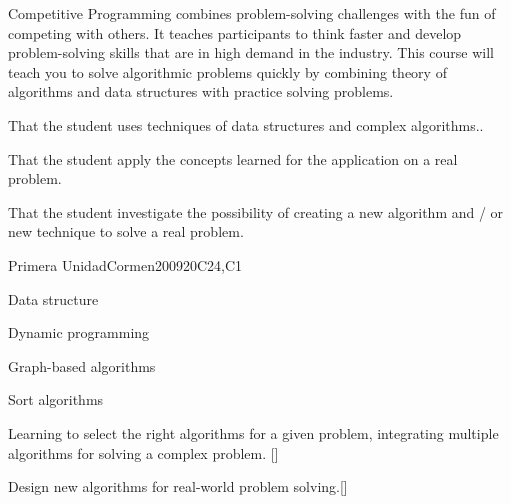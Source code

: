 \begin{syllabus}


\begin{justification}
Competitive Programming combines problem-solving challenges with the fun of competing with others. It teaches participants to think faster and develop problem-solving skills that are in high demand in the industry.
This course will teach you to solve algorithmic problems quickly by combining theory of algorithms and data structures with practice solving problems.
\end{justification}

\begin{goals}
\item That the student uses techniques of data structures and complex algorithms..
\item That the student apply the concepts learned for the application on a real problem.
\item That the student investigate the possibility of creating a new algorithm and / or new technique to solve a real problem.
\end{goals}

\begin{outcomes}
    \item {}
    \item {}
    \item {}
    \item {}
\end{outcomes}

\begin{competences}
    \item {}
    \item {}
\end{competences}

\begin{unit}{Primera Unidad}{}{Cormen2009}{20}{C24,C1}
\begin{topics}
        \item Data structure
        \item Dynamic programming
        \item Graph-based algorithms
        \item Sort algorithms
\end{topics}
\begin{learningoutcomes}
        \item Learning to select the right algorithms for a given problem, integrating multiple algorithms for solving a complex problem. [\Usage]
	\item Design new algorithms for real-world problem solving.[\Usage]
\end{learningoutcomes}
\end{unit}

\begin{coursebibliography}
\end{coursebibliography}

\end{syllabus}
